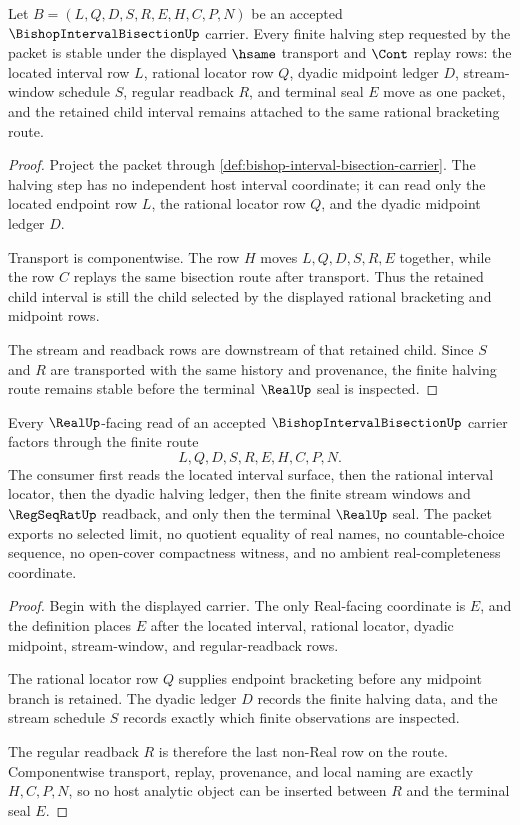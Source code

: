 \begin{theorem}
\label{thm:bishop-interval-bisection-halving-stability}
Let $B=(L,Q,D,S,R,E,H,C,P,N)$ be an accepted $\BishopIntervalBisectionUp$ carrier. Every finite halving step requested by the packet is stable under the displayed $\hsame$ transport and $\Cont$ replay rows: the located interval row $L$, rational locator row $Q$, dyadic midpoint ledger $D$, stream-window schedule $S$, regular readback $R$, and terminal seal $E$ move as one packet, and the retained child interval remains attached to the same rational bracketing route.
\end{theorem}
\begin{proof}
Project the packet through \autoref{def:bishop-interval-bisection-carrier}. The halving step has no independent host interval coordinate; it can read only the located endpoint row $L$, the rational locator row $Q$, and the dyadic midpoint ledger $D$.

Transport is componentwise. The row $H$ moves $L,Q,D,S,R,E$ together, while the row $C$ replays the same bisection route after transport. Thus the retained child interval is still the child selected by the displayed rational bracketing and midpoint rows.

The stream and readback rows are downstream of that retained child. Since $S$ and $R$ are transported with the same history and provenance, the finite halving route remains stable before the terminal $\RealUp$ seal is inspected.
\end{proof}

\begin{theorem}
\label{thm:bishop-interval-bisection-real-seal-nonescape}
Every $\RealUp$-facing read of an accepted $\BishopIntervalBisectionUp$ carrier factors through the finite route
$$
L,Q,D,S,R,E,H,C,P,N .
$$
The consumer first reads the located interval surface, then the rational interval locator, then the dyadic halving ledger, then the finite stream windows and $\RegSeqRatUp$ readback, and only then the terminal $\RealUp$ seal. The packet exports no selected limit, no quotient equality of real names, no countable-choice sequence, no open-cover compactness witness, and no ambient real-completeness coordinate.
\end{theorem}
\begin{proof}
Begin with the displayed carrier. The only Real-facing coordinate is $E$, and the definition places $E$ after the located interval, rational locator, dyadic midpoint, stream-window, and regular-readback rows.

The rational locator row $Q$ supplies endpoint bracketing before any midpoint branch is retained. The dyadic ledger $D$ records the finite halving data, and the stream schedule $S$ records exactly which finite observations are inspected.

The regular readback $R$ is therefore the last non-Real row on the route. Componentwise transport, replay, provenance, and local naming are exactly $H,C,P,N$, so no host analytic object can be inserted between $R$ and the terminal seal $E$.
\end{proof}

